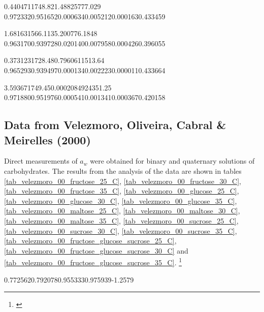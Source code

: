 %
	{0.440471}{1748.82}{1.48825}{777.029}
%
	{0.972332}{0.951652}{0.000634}{0.005212}{0.000163}{0.433459}

%
	{1.68163}{1566.11}{35.2007}{76.1848}
%
	{0.963170}{0.939728}{0.020140}{0.007958}{0.000426}{0.396055}

%
	{0.373123}{1728.48}{0.796061}{1513.64}
%
	{0.965293}{0.939497}{0.000134}{0.002223}{0.000011}{0.433664}

%
	{3.59367}{1749.45}{0.000208492}{4351.25}
%
	{0.971880}{0.951976}{0.000541}{0.001341}{0.000367}{0.420158}

\FloatBarrier

\subsection{Data from Velezmoro, Oliveira, Cabral \& Meirelles (2000)}

Direct measurements of $a_w$ were obtained for binary and quaternary solutions
of carbohydrates. The results from the analysis of the data are shown in tables
\ref{tab_velezmoro_00_fructose_25_C},
\ref{tab_velezmoro_00_fructose_30_C}, \ref{tab_velezmoro_00_fructose_35_C},
\ref{tab_velezmoro_00_glucose_25_C}, \ref{tab_velezmoro_00_glucose_30_C},
\ref{tab_velezmoro_00_glucose_35_C}, \ref{tab_velezmoro_00_maltose_25_C},
\ref{tab_velezmoro_00_maltose_30_C}, \ref{tab_velezmoro_00_maltose_35_C},
\ref{tab_velezmoro_00_sucrose_25_C}, \ref{tab_velezmoro_00_sucrose_30_C},
\ref{tab_velezmoro_00_sucrose_35_C},
\ref{tab_velezmoro_00_fructose_glucose_sucrose_25_C},
\ref{tab_velezmoro_00_fructose_glucose_sucrose_30_C} and
\ref{tab_velezmoro_00_fructose_glucose_sucrose_35_C}.
\footnote{\cite{velezmoro2000}}

%
	{0.772562}{0.792078}{0.955333}{0.975939}{-1.2579}


